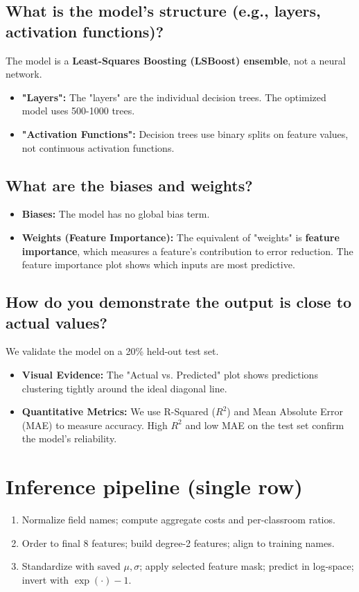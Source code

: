 \documentclass[11pt]{article}
\begin{document}
\subsection*{What is the model's structure (e.g., layers, activation functions)?}
The model is a \textbf{Least-Squares Boosting (LSBoost) ensemble}, not a neural network.
\begin{itemize}
    \item \textbf{"Layers":} The "layers" are the individual decision trees. The optimized model uses 500-1000 trees.
    \item \textbf{"Activation Functions":} Decision trees use binary splits on feature values, not continuous activation functions.
\end{itemize}

\subsection*{What are the biases and weights?}
\begin{itemize}
    \item \textbf{Biases:} The model has no global bias term.
    \item \textbf{Weights (Feature Importance):} The equivalent of "weights" is \textbf{feature importance}, which measures a feature's contribution to error reduction. The feature importance plot shows which inputs are most predictive.
\end{itemize}

\subsection*{How do you demonstrate the output is close to actual values?}
We validate the model on a 20\% held-out test set.
\begin{itemize}
    \item \textbf{Visual Evidence:} The "Actual vs. Predicted" plot shows predictions clustering tightly around the ideal diagonal line.
    \item \textbf{Quantitative Metrics:} We use R-Squared ($R^2$) and Mean Absolute Error (MAE) to measure accuracy. High $R^2$ and low MAE on the test set confirm the model's reliability.
\end{itemize}

\section*{Inference pipeline (single row)}
\begin{enumerate}
  \item Normalize field names; compute aggregate costs and per-classroom ratios.
  \item Order to final 8 features; build degree-2 features; align to training names.
  \item Standardize with saved $\mu,\sigma$; apply selected feature mask; predict in log-space; invert with $\exp(\cdot)-1$.
\end{enumerate}
\end{document}
